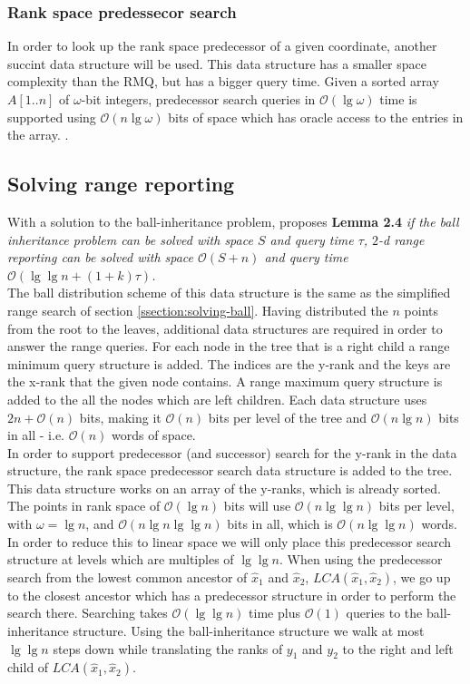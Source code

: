 \subsubsection{Rank space predessecor search}
In order to look up the rank space predecessor of a given coordinate, another succint data structure will be used. This data structure has a smaller space complexity than the RMQ, but has a bigger query time.
Given a sorted array $A[1..n]$ of $\omega$-bit integers, predecessor search queries in $\mathcal{O}(\lg \omega)$ time is supported using $\mathcal{O}(n \lg \omega)$ bits of space which has oracle access to the entries in the array. . 

\subsection{Solving range reporting}
With a solution to the ball-inheritance problem, \citet{chanetal} proposes \textbf{Lemma 2.4} \emph{if the ball inheritance problem can be solved with space $S$ and query time $\tau$, $2$-d range reporting can be solved with space $\mathcal{O}(S+n)$ and query time $\mathcal{O}(\lg \lg n + (1+k) \tau)$.} \\


The ball distribution scheme of this data structure is the same as the simplified range search of section \ref{ssection:solving-ball}. Having distributed the $n$ points from the root to the leaves, additional data structures are required in order to answer the range queries. For each node in the tree that is a right child a range minimum query structure is added. The indices are the y-rank and the keys are the x-rank that the given node contains. A range maximum query structure is added to the all the nodes which are left children. Each data structure uses $2n + \mathcal{O}(n)$ bits, making it $\mathcal{O}(n)$ bits per level of the tree and $\mathcal{O}(n \lg n)$ bits in all - i.e. $\mathcal{O}(n)$ words of space. \\

In order to support predecessor (and successor) search for the y-rank in the data structure, the rank space predecessor search data structure is added to the tree. This data structure works on an array of the y-ranks, which is already sorted. The points in rank space of $\mathcal{O}(\lg n)$ bits will use $\mathcal{O}(n \lg \lg n)$ bits per level, with $\omega = \lg n$, and $\mathcal{O}(n \lg n \lg \lg n)$ bits in all, which is $\mathcal{O}(n \lg \lg n)$ words. In order to reduce this to linear space we will only place this predecessor search structure at levels which are multiples of $\lg \lg n$. When using the predecessor search from the lowest common ancestor of $\hat{x}_1$ and $\hat{x}_2$, $LCA(\hat{x}_1, \hat{x}_2)$, we go up to the closest ancestor which has a predecessor structure in order to perform the search there. Searching takes $\mathcal{O}(\lg \lg n)$ time plus $\mathcal{O}(1)$ queries to the ball-inheritance structure. Using the ball-inheritance structure we walk at most $\lg \lg n$ steps down while translating the ranks of $y_1$ and $y_2$ to the right and left child of $LCA(\hat{x}_1, \hat{x}_2)$. 

